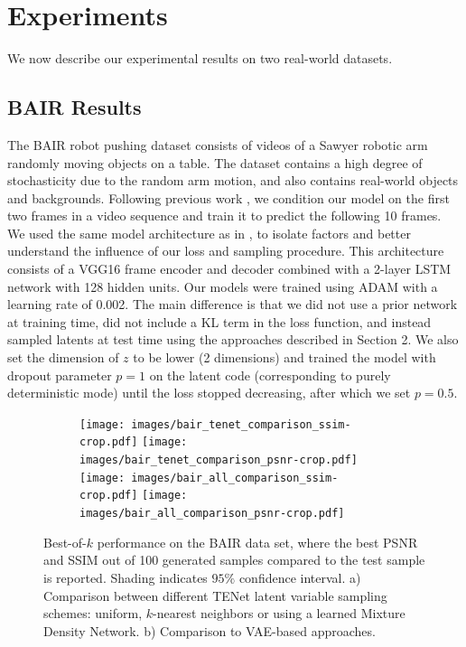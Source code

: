 \documentclass{article}
\newcommand{\modelname}{TENet }
\begin{document}
\section{Experiments}

We now describe our experimental results on two real-world datasets.

\subsection{BAIR Results}

The BAIR robot pushing dataset \citep{Ebert17} consists of videos of a Sawyer robotic arm randomly moving objects on a table.
The dataset contains a high degree of stochasticity due to the random arm motion, and also contains real-world objects and backgrounds.
Following previous work \citep{Babaeizadeh2018, Denton2018}, we condition our model on the first two frames in a video sequence and train it to predict the following 10 frames.
We used the same model architecture as in \citep{Denton2018}, to isolate factors and better understand the influence of our loss and sampling procedure.
This architecture consists of a VGG16 frame encoder and decoder combined with a 2-layer LSTM network with 128 hidden units.
Our models were trained using ADAM \citep{ADAM} with a learning rate of 0.002.
The main difference is that we did not use a prior network at training time, did not include a KL term in the loss function, and instead sampled latents at test time using the approaches described in Section 2.
We also set the dimension of $z$ to be lower (2 dimensions) and trained the model with dropout parameter $p=1$ on the latent code (corresponding to purely deterministic mode) until the loss stopped decreasing, after which we set $p=0.5$.

\begin{figure}
  \centering
  \begin{subfigure}[b]{\textwidth}
    \centering
  \texttt{[image: images/bair\_tenet\_comparison\_ssim-crop.pdf]}
  \texttt{[image: images/bair\_tenet\_comparison\_psnr-crop.pdf]}
  \texttt{[image: images/bair\_all\_comparison\_ssim-crop.pdf]}
  \texttt{[image: images/bair\_all\_comparison\_psnr-crop.pdf]}
  \caption{}
    \label{fig:gull}
  \end{subfigure}
  \caption{Best-of-$k$ performance on the BAIR data set, where the best PSNR and SSIM out of 100 generated samples compared to the test sample is reported. Shading indicates $95\%$ confidence interval. a) Comparison between different \modelname latent variable sampling schemes: uniform, $k$-nearest neighbors or using a learned Mixture Density Network. b) Comparison to VAE-based approaches.}
  \label{bair}
\end{figure}
\end{document}
